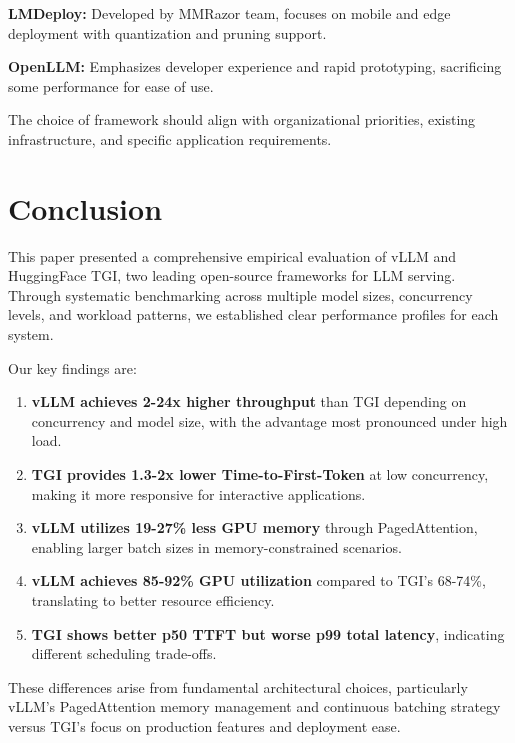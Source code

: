 \documentclass{article}
\begin{document}
\textbf{LMDeploy:} Developed by MMRazor team, focuses on mobile and edge deployment with quantization and pruning support.

\textbf{OpenLLM:} Emphasizes developer experience and rapid prototyping, sacrificing some performance for ease of use.

The choice of framework should align with organizational priorities, existing infrastructure, and specific application requirements.

\section{Conclusion}

This paper presented a comprehensive empirical evaluation of vLLM and HuggingFace TGI, two leading open-source frameworks for LLM serving. Through systematic benchmarking across multiple model sizes, concurrency levels, and workload patterns, we established clear performance profiles for each system.

Our key findings are:

\begin{enumerate}
    \item \textbf{vLLM achieves 2-24x higher throughput} than TGI depending on concurrency and model size, with the advantage most pronounced under high load.
    
    \item \textbf{TGI provides 1.3-2x lower Time-to-First-Token} at low concurrency, making it more responsive for interactive applications.
    
    \item \textbf{vLLM utilizes 19-27\% less GPU memory} through PagedAttention, enabling larger batch sizes in memory-constrained scenarios.
    
    \item \textbf{vLLM achieves 85-92\% GPU utilization} compared to TGI's 68-74\%, translating to better resource efficiency.
    
    \item \textbf{TGI shows better p50 TTFT but worse p99 total latency}, indicating different scheduling trade-offs.
\end{enumerate}

These differences arise from fundamental architectural choices, particularly vLLM's PagedAttention memory management and continuous batching strategy versus TGI's focus on production features and deployment ease.
\end{document}

